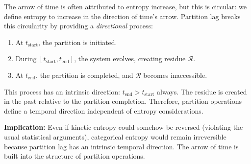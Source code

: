 \documentclass[twocolumn,10pt]{article}
\theoremstyle{definition}
\theoremstyle{remark}
\begin{document}
The arrow of time is often attributed to entropy increase, but this is circular: we define entropy to increase in the direction of time's arrow. Partition lag breaks this circularity by providing a \textit{directional} process:

\begin{enumerate}
\item At $t_{\text{start}}$, the partition is initiated.
\item During $[t_{\text{start}}, t_{\text{end}}]$, the system evolves, creating residue $\mathcal{R}$.
\item At $t_{\text{end}}$, the partition is completed, and $\mathcal{R}$ becomes inaccessible.
\end{enumerate}

This process has an intrinsic direction: $t_{\text{end}} > t_{\text{start}}$ always. The residue is created in the past relative to the partition completion. Therefore, partition operations define a temporal direction independent of entropy considerations.

\textbf{Implication:} Even if kinetic entropy could somehow be reversed (violating the usual statistical arguments), categorical entropy would remain irreversible because partition lag has an intrinsic temporal direction. The arrow of time is built into the structure of partition operations.
\end{document}
